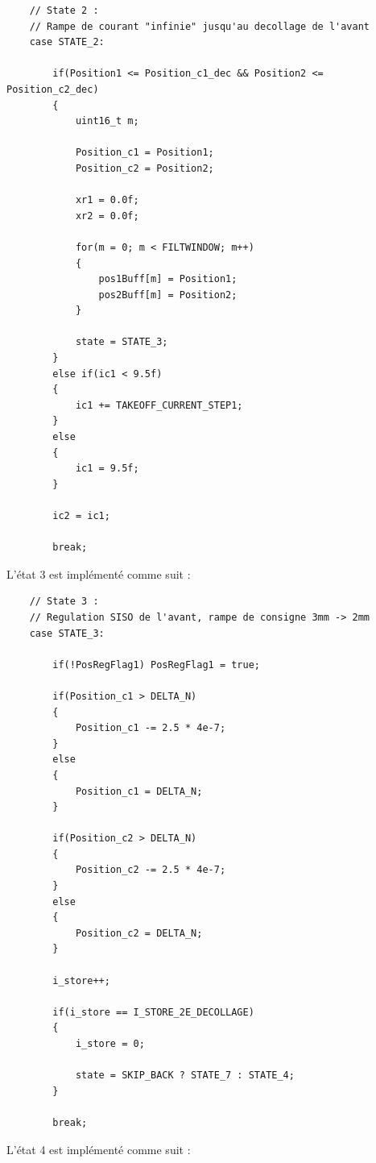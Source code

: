 \begin{verbatim}
    // State 2 :
    // Rampe de courant "infinie" jusqu'au decollage de l'avant
    case STATE_2:

        if(Position1 <= Position_c1_dec && Position2 <= Position_c2_dec)
        {
            uint16_t m;

            Position_c1 = Position1;
            Position_c2 = Position2;

            xr1 = 0.0f;
            xr2 = 0.0f;

            for(m = 0; m < FILTWINDOW; m++)
            {
                pos1Buff[m] = Position1;
                pos2Buff[m] = Position2;
            }

            state = STATE_3;
        }
        else if(ic1 < 9.5f)
        {
            ic1 += TAKEOFF_CURRENT_STEP1;
        }
        else
        {
            ic1 = 9.5f;
        }

        ic2 = ic1;

        break;
\end{verbatim}

L'état 3 est implémenté comme suit :

\begin{verbatim}
    // State 3 :
    // Regulation SISO de l'avant, rampe de consigne 3mm -> 2mm
    case STATE_3:

        if(!PosRegFlag1) PosRegFlag1 = true;

        if(Position_c1 > DELTA_N)
        {
            Position_c1 -= 2.5 * 4e-7;
        }
        else
        {
            Position_c1 = DELTA_N;
        }

        if(Position_c2 > DELTA_N)
        {
            Position_c2 -= 2.5 * 4e-7;
        }
        else
        {
            Position_c2 = DELTA_N;
        }

        i_store++;

        if(i_store == I_STORE_2E_DECOLLAGE)
        {
            i_store = 0;

            state = SKIP_BACK ? STATE_7 : STATE_4;
        }

        break;
\end{verbatim}

L'état 4 est implémenté comme suit :

